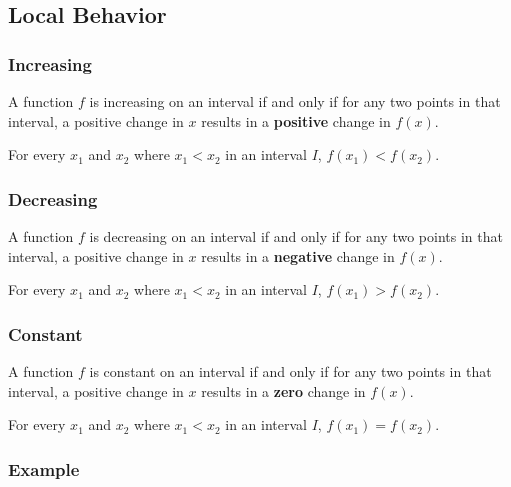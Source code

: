 \documentclass[11pt]{article}
\begin{document}
\subsection{Local Behavior}

\subsubsection*{Increasing}

A function $f$ is increasing on an interval if and only if for any two points in that interval, a positive change in $x$ results in a \textbf{positive} change in $f(x)$.

For every $x_{1}$ and $x_{2}$ where $x_{1} < x_{2}$ in an interval $I$, $f(x_{1}) < f(x_{2})$.

\subsubsection*{Decreasing}

A function $f$ is decreasing on an interval if and only if for any two points in that interval, a positive change in $x$ results in a \textbf{negative} change in $f(x)$.

For every $x_{1}$ and $x_{2}$ where $x_{1} < x_{2}$ in an interval $I$, $f(x_{1}) > f(x_{2})$.

\subsubsection*{Constant}

A function $f$ is constant on an interval if and only if for any two points in that interval, a positive change in $x$ results in a \textbf{zero} change in $f(x)$.

For every $x_{1}$ and $x_{2}$ where $x_{1} < x_{2}$ in an interval $I$, $f(x_{1}) = f(x_{2})$.

\subsubsection*{Example}

\begin{center}
\end{center}
\end{document}
